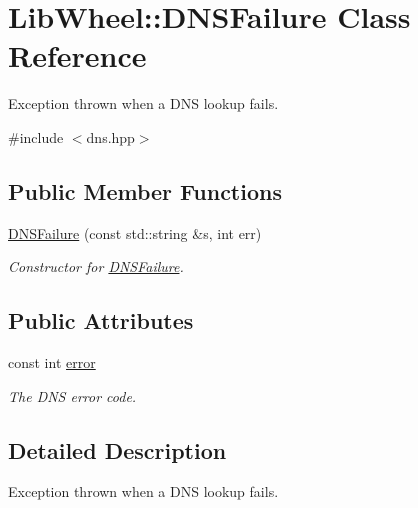 \hypertarget{classLibWheel_1_1DNSFailure}{
\section{\-Lib\-Wheel\-:\-:\-D\-N\-S\-Failure \-Class \-Reference}
\label{classLibWheel_1_1DNSFailure}
}


\-Exception thrown when a \-D\-N\-S lookup fails.  




{\ttfamily \#include $<$dns.\-hpp$>$}

\subsection*{\-Public \-Member \-Functions}
\begin{DoxyCompactItemize}
\item 
\hyperlink{classLibWheel_1_1DNSFailure_a35d878da947006d3a81573f89b6df5bc}{\-D\-N\-S\-Failure} (const std\-::string \&s, int err)
\begin{DoxyCompactList}\small\item\em \-Constructor for \hyperlink{classLibWheel_1_1DNSFailure}{\-D\-N\-S\-Failure}. \end{DoxyCompactList}\end{DoxyCompactItemize}
\subsection*{\-Public \-Attributes}
\begin{DoxyCompactItemize}
\item 
const int \hyperlink{classLibWheel_1_1DNSFailure_adfaa13f2ba0aa15a611ed1ad035323b6}{error}
\begin{DoxyCompactList}\small\item\em \-The \-D\-N\-S error code. \end{DoxyCompactList}\end{DoxyCompactItemize}


\subsection{\-Detailed \-Description}
\-Exception thrown when a \-D\-N\-S lookup fails. 


